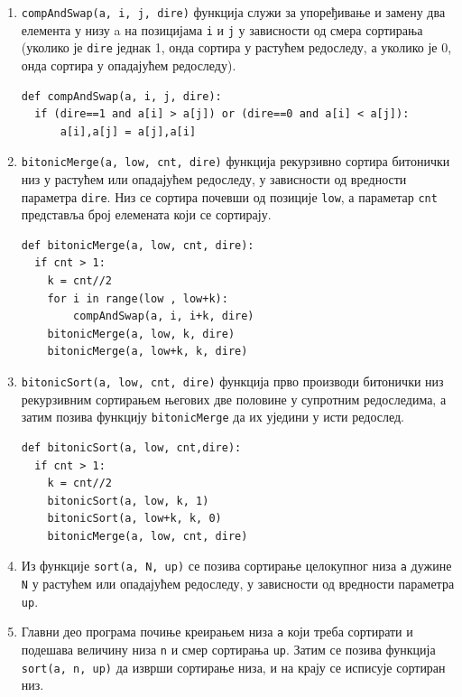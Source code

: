\documentclass[12pt, a4paper]{article}
\theoremstyle{definition}
\begin{document}
\begin{enumerate}
\item \verb+compAndSwap(a, i, j, dire)+ функција служи за упоређивање и замену два елемента у низу a на позицијама \verb+i+ и \verb+j+ у зависности од смера сортирања (уколико је \verb+dire+ једнак 1, онда сортира у растућем редоследу, а уколико је 0, онда сортира у опадајућем редоследу).
\begin{verbatim}
def compAndSwap(a, i, j, dire):
  if (dire==1 and a[i] > a[j]) or (dire==0 and a[i] < a[j]):
      a[i],a[j] = a[j],a[i]
\end{verbatim}


\item \verb+bitonicMerge(a, low, cnt, dire)+ функција рекурзивно сортира битонички низ у растућем или опадајућем редоследу, у зависности од вредности параметра \verb+dire+. Низ се сортира почевши од позиције \verb+low+, а параметар \verb+cnt+ представља број елемената који се сортирају.
\begin{verbatim}
def bitonicMerge(a, low, cnt, dire):
  if cnt > 1:
    k = cnt//2
    for i in range(low , low+k):
        compAndSwap(a, i, i+k, dire)
    bitonicMerge(a, low, k, dire)
    bitonicMerge(a, low+k, k, dire)
\end{verbatim}
\item \verb+bitonicSort(a, low, cnt, dire)+ функција прво производи битонички низ рекурзивним сортирањем његових две половине у супротним редоследима, а затим позива функцију \verb+bitonicMerge+ да их уједини у исти редослед.
\begin{verbatim}
def bitonicSort(a, low, cnt,dire):
  if cnt > 1:
    k = cnt//2
    bitonicSort(a, low, k, 1)
    bitonicSort(a, low+k, k, 0)
    bitonicMerge(a, low, cnt, dire)
\end{verbatim}


\item Из функције \verb+sort(a, N, up)+ се позива сортирање целокупног низа \verb+a+ дужине \verb+N+ у растућем или опадајућем редоследу, у зависности од вредности параметра \verb+up+.

\item Главни део програма почиње креирањем низа \verb+a+ који треба сортирати и подешава величину низа \verb+n+ и смер сортирања \verb+up+. Затим се позива функција \verb+sort(a, n, up)+ да изврши сортирање низа, и на крају се исписује сортиран низ.

\end{enumerate}
\end{document}
